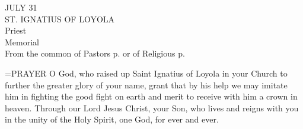 \begin{center}\normalsize JULY 31\\
\footnotesize ST. IGNATIUS OF LOYOLA\\
\footnotesize Priest \\
\footnotesize Memorial\\
\footnotesize From the common of Pastors p.    or of Religious p. \\
\end{center}

\hangindent=\parindent \small{PRAYER 
O God, who raised up Saint Ignatius of Loyola in your Church
to further the greater glory of your name,
grant that by his help we may imitate him
in fighting the good fight on earth
and merit to receive with him a crown in heaven.
Through our Lord Jesus Christ, your Son,
who lives and reigns with you in the unity of the Holy Spirit,
one God, for ever and ever.\\}
 
